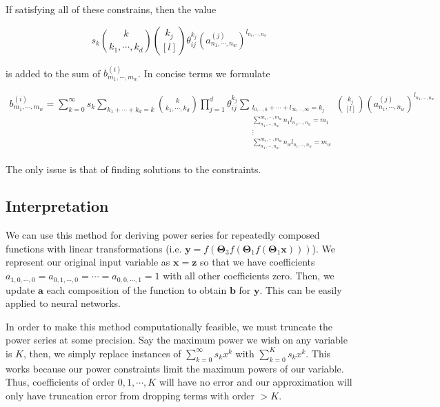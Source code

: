 \documentclass{article}
\begin{document}
\noindent
If satisfying all of these constrains, then the value

\begin{equation*}
    s_k \binom{k}{k_1, \cdots, k_d} \binom{k_j}{[l]} \theta_{ij}^{k_j} (a^{(j)}_{n_1, \cdots, n_w})^{l_{n_1, \cdots, n_w}}
\end{equation*}

\noindent
is added to the sum of $b^{(i)}_{m_1, \cdots, m_w}$. In concise terms we formulate

\begin{align*}
    b^{(i)}_{m_1, \cdots, m_w} = \sum_{k=0}^{\infty} s_k \sum_{k_1 + \cdots + k_d = k} \binom{k}{k_1, \cdots, k_d} \prod_{j=1}^{d} \theta_{ij}^{k_j} \sum_{\substack{l_{0, \cdots, 0} + \cdots + l_{\infty, \cdots, \infty} = k_j \\ \sum_{n_1, \cdots, n_w}^{m_1, \cdots, m_w} n_1 l_{n_1, \cdots, n_w} = m_1 \\ \vdots \\ \sum_{n_1, \cdots, n_w}^{m_1, \cdots, m_w} n_w l_{n_1, \cdots, n_w} = m_w}} \binom{k_j}{[l]} (a^{(j)}_{n_1, \cdots, n_w})^{l_{n_1, \cdots, n_w}}
\end{align*}

\noindent
The only issue is that of finding solutions to the constraints.

\subsection{Interpretation}

We can use this method for deriving power series for repeatedly composed functions with linear transformations (i.e. $\mathbf{y} = f(\mathbf{\Theta}_3 f(\mathbf{
\Theta}_1 f(\mathbf{\Theta}_1 \mathbf{x})))$). We represent our original input variable as $\mathbf{x} = \mathbf{z}$ so that we have coefficients $a_{1, 0, \cdots, 0} = a_{0, 1, \cdots, 0} = \cdots = a_{0, 0, \cdots, 1} = 1$ with all other coefficients zero. Then, we update $\mathbf{a}$ each composition of the function to obtain $\mathbf{b}$ for $\mathbf{y}$. This can be easily applied to neural networks.

\vspace{0.10in}
\noindent
In order to make this method computationally feasible, we must truncate the power series at some precision. Say the maximum power we wish on any variable is $K$, then, we simply replace instances of $\sum_{k=0}^{\infty} s_k x^k$ with $\sum_{k=0}^{K} s_k x^k$. This works because our power constraints limit the maximum powers of our variable. Thus, coefficients of order $0, 1, \cdots, K$ will have no error and our approximation will only have truncation error from dropping terms with order $> K$.
\end{document}
